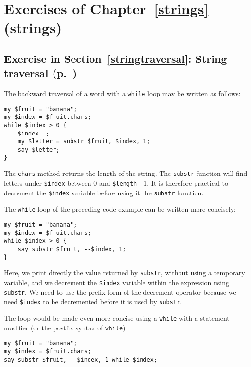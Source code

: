 \section{Exercises of Chapter~\ref{strings} (strings)}

\subsection{Exercise in Section~\ref{stringtraversal}: String traversal (p.~\pageref{stringtraversal})}
\label{sol_stringtraversal}

The backward traversal of a word with a {\tt while} loop may
be written as follows:

\begin{verbatim}
my $fruit = "banana";
my $index = $fruit.chars;
while $index > 0 { 
    $index--;
    my $letter = substr $fruit, $index, 1; 
    say $letter; 
}
\end{verbatim}
%

The {\tt chars} method returns the length of the string. The 
{\tt substr} function will find letters under \verb'$index' 
between 0 and \verb'$length' - 1. It is therefore practical 
to decrement the \verb'$index' variable before using it the
{\tt substr} function. 

The \verb'while' loop of the preceding code example can be 
written more concisely:

\begin{verbatim}
my $fruit = "banana";
my $index = $fruit.chars;
while $index > 0 { 
    say substr $fruit, --$index, 1; 
}
\end{verbatim}
%

Here, we print directly the value returned by {\tt substr}, 
without using a temporary variable, and we decrement the 
\verb'$index' variable within the expression using {\tt substr}.
We need to use the prefix form of the decrement operator 
because we need \verb'$index' to be decremented before it is 
used by {\tt substr}.

The loop would be made even more concise using a {\tt while} with 
a statement modifier (or the postfix syntax of {\tt while}):

\begin{verbatim}
my $fruit = "banana";
my $index = $fruit.chars;
say substr $fruit, --$index, 1 while $index;
\end{verbatim}
%

